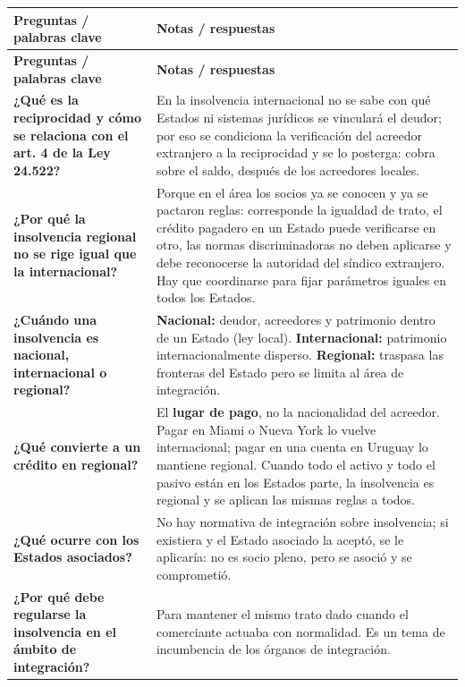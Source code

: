 \documentclass[12pt,oneside]{book}
\begin{document}
\begin{longtable}{
    >{\raggedright\arraybackslash}p{}
    >{\raggedright\arraybackslash}p{}
}
\toprule
\textbf{Preguntas / palabras clave} &
\textbf{Notas / respuestas} \\
\midrule
\endfirsthead
\toprule
\textbf{Preguntas / palabras clave} &
\textbf{Notas / respuestas} \\
\midrule
\endhead
\bottomrule
\endfoot
\bottomrule
\endlastfoot

\textbf{¿Qué es la reciprocidad y cómo se relaciona con el art. 4 de la Ley 24.522?} &
En la insolvencia internacional no se sabe con qué Estados ni sistemas jurídicos se vinculará el deudor; por eso se condiciona la verificación del acreedor extranjero a la reciprocidad y se lo posterga: cobra sobre el saldo, después de los acreedores locales. \\

\textbf{¿Por qué la insolvencia regional no se rige igual que la internacional?} &
Porque en el área los socios ya se conocen y ya se pactaron reglas: corresponde la igualdad de trato, el crédito pagadero en un Estado puede verificarse en otro, las normas discriminadoras no deben aplicarse y debe reconocerse la autoridad del síndico extranjero. Hay que coordinarse para fijar parámetros iguales en todos los Estados. \\

\textbf{¿Cuándo una insolvencia es nacional, internacional o regional?} &
\textbf{Nacional:} deudor, acreedores y patrimonio dentro de un Estado (ley local). \textbf{Internacional:} patrimonio internacionalmente disperso. \textbf{Regional:} traspasa las fronteras del Estado pero se limita al área de integración. \\

\textbf{¿Qué convierte a un crédito en regional?} &
El \textbf{lugar de pago}, no la nacionalidad del acreedor. Pagar en Miami o Nueva York lo vuelve internacional; pagar en una cuenta en Uruguay lo mantiene regional. Cuando todo el activo y todo el pasivo están en los Estados parte, la insolvencia es regional y se aplican las mismas reglas a todos. \\

\textbf{¿Qué ocurre con los Estados asociados?} &
No hay normativa de integración sobre insolvencia; si existiera y el Estado asociado la aceptó, se le aplicaría: no es socio pleno, pero se asoció y se comprometió. \\

\textbf{¿Por qué debe regularse la insolvencia en el ámbito de integración?} &
Para mantener el mismo trato dado cuando el comerciante actuaba con normalidad. Es un tema de incumbencia de los órganos de integración. \\


\end{longtable}
\end{document}
